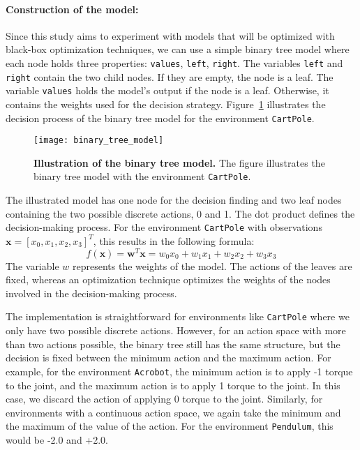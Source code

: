 \paragraph*{Construction of the model:} Since this study aims to experiment with models that will be optimized with black-box optimization techniques, we can use a simple binary tree model where each node holds three properties: \verb|values|, \verb|left|, \verb|right|. The variables \verb|left| and \verb|right| contain the two child nodes. If they are empty, the node is a leaf. The variable \verb|values| holds the model's output if the node is a leaf. Otherwise, it contains the weights used for the decision strategy. Figure~\ref{fig:binary_tree_model_illustration} illustrates the decision process of the binary tree model for the environment \verb|CartPole|.
\begin{figure}[!ht]
\centering
\texttt{[image: binary\_tree\_model]}
\caption[Illustration of the binary tree model]{
  \textbf{Illustration of the binary tree model.}
  The figure illustrates the binary tree model with the environment \texttt{CartPole}.
}
\label{fig:binary_tree_model_illustration}
\end{figure}
The illustrated model has one node for the decision finding and two leaf nodes containing the two possible discrete actions, 0 and 1. The dot product defines the decision-making process. For the environment \verb|CartPole| with observations $\mathbf{x} = [x_0, x_1, x_2, x_3]^T$, this results in the following formula:
\[
  f(\mathbf{x}) = \mathbf{w}^T\mathbf{x} = w_0 x_0 + w_1 x_1 + w_2 x_2 + w_3 x_3
\]
The variable $w$ represents the weights of the model. The actions of the leaves are fixed, whereas an optimization technique optimizes the weights of the nodes involved in the decision-making process.

The implementation is straightforward for environments like \verb|CartPole| where we only have two possible discrete actions. However, for an action space with more than two actions possible, the binary tree still has the same structure, but the decision is fixed between the minimum action and the maximum action. For example, for the environment \verb|Acrobot|, the minimum action is to apply -1 torque to the joint, and the maximum action is to apply 1 torque to the joint. In this case, we discard the action of applying 0 torque to the joint. Similarly, for environments with a continuous action space, we again take the minimum and the maximum of the value of the action. For the environment \verb|Pendulum|, this would be -2.0 and +2.0.

